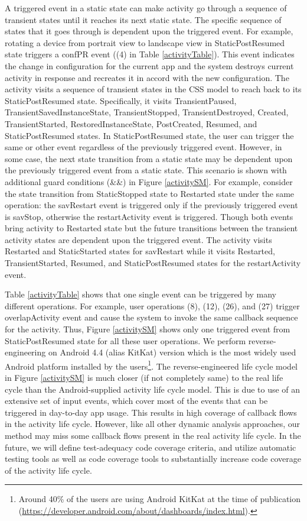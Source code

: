 \documentclass[10pt]{elsarticle}
\begin{document}
A triggered event in a static state can make activity go through a sequence of transient states until it reaches its next static state. The specific sequence of states that it goes through is dependent upon the triggered event. For example, rotating a device from portrait view to landscape view in StaticPostResumed state triggers a confPR event ((4) in Table \ref{activityTable}). This event indicates the change in configuration for the current app and the system destroys current activity in response and recreates it in accord with the new configuration. The activity visits a sequence of transient states in the CSS model to reach back to its StaticPostResumed state. Specifically, it visits TransientPaused, TransientSavedInstanceState, TransientStopped, TransientDestroyed, Created, TransientStarted, RestoredInstanceState, PostCreated, Resumed, and StaticPostResumed states. In StaticPostResumed state, the user can trigger the same or other event regardless of the previously triggered event. However, in some case, the next state transition from a static state may be dependent upon the previously triggered event from a static state. This scenario is shown with additional guard conditions (\&\&) in Figure \ref{activitySM}. For example, consider the state transition from StaticStopped state to Restarted state under the same operation: the savRestart event is triggered only if the previously triggered event is savStop, otherwise the restartActivity event is triggered. Though both events bring activity to Restarted state but the future transitions between the transient activity states are dependent upon the triggered event. The activity visits Restarted and StaticStarted states for savRestart while it visits Restarted, TransientStarted, Resumed, and StaticPostResumed states for the restartActivity event.

Table \ref{activityTable} shows that one single event can be triggered by many different operations. For example, user operations (8), (12), (26), and (27) trigger overlapActivity event and cause the system to invoke the same callback sequence for the activity. Thus, Figure \ref{activitySM} shows only one triggered event from StaticPostResumed state for all these user operations. We perform reverse-engineering on Android 4.4 (alias KitKat) version which is the most widely used Android platform installed by the users\footnote{Around 40\% of the users are using Android KitKat at the time of publication (\url{https://developer.android.com/about/dashboards/index.html}).}. The reverse-engineered life cycle model in Figure \ref{activitySM} is much closer (if not completely same) to the real life cycle than the Android-supplied activity life cycle model. This is due to use of an extensive set of input events, which cover most of the events that can be triggered in day-to-day app usage. This results in high coverage of callback flows in the activity life cycle. However, like all other dynamic analysis approaches, our method may miss some callback flows present in the real activity life cycle. In the future, we will define test-adequacy code coverage criteria, and utilize automatic testing tools as well as code coverage tools to substantially increase code coverage of the activity life cycle.
\end{document}
